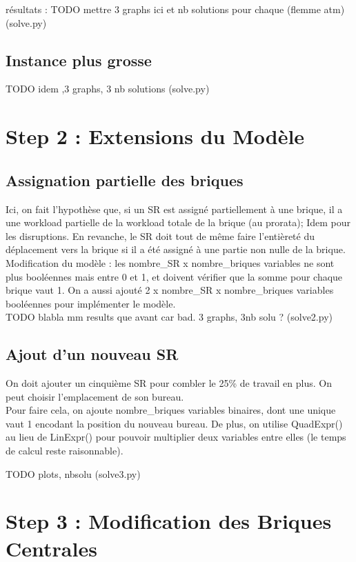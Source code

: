 \documentclass[12pt,a4paper]{article}
\begin{document}
résultats :
TODO mettre 3 graphs ici et nb solutions pour chaque (flemme atm) (solve.py)

\subsection*{Instance plus grosse}

TODO idem ,3 graphs, 3 nb solutions (solve.py)

\section*{Step 2 : Extensions du Modèle}

\subsection*{Assignation partielle des briques}
Ici, on fait l'hypothèse que, si un SR est assigné partiellement à une brique, il a une workload partielle de la workload totale de la brique (au prorata); Idem pour les disruptions. En revanche, le SR doit tout de même faire l'entièreté du déplacement vers la brique si il a été assigné à une partie non nulle de la brique.
\\
Modification du modèle : les nombre\_SR x nombre\_briques variables ne sont plus booléennes mais entre 0 et 1, et doivent vérifier que la somme pour chaque brique vaut 1.
On a aussi ajouté 2 x nombre\_SR x nombre\_briques variables booléennes pour implémenter le modèle.
\\
TODO blabla mm results que avant car bad. 3 graphs, 3nb solu ? (solve2.py)

\subsection*{Ajout d'un nouveau SR}

On doit ajouter un cinquième SR pour combler le 25\% de travail en plus. On peut choisir l'emplacement de son bureau.\\
Pour faire cela, on ajoute nombre\_briques variables binaires, dont une unique vaut 1 encodant la position du nouveau bureau. De plus, on utilise QuadExpr() au lieu de LinExpr() pour pouvoir multiplier deux variables entre elles (le temps de calcul reste raisonnable).

TODO plots, nbsolu (solve3.py)

\section*{Step 3 : Modification des Briques Centrales}
\end{document}
